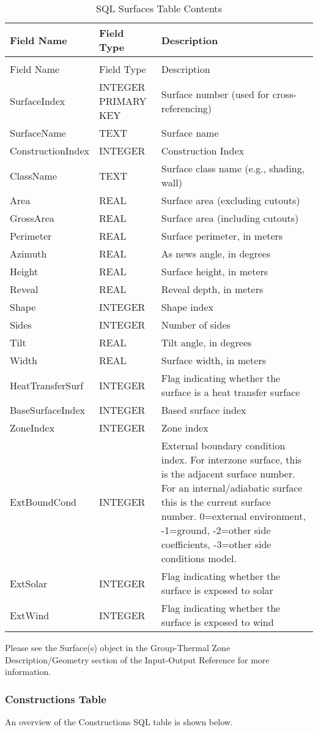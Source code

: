 \begin{longtable}[c]{p{1.5in}p{1.5in}p{3.0in}}
\caption{SQL Surfaces Table Contents \label{table:table-25.-sql-surfaces-table-contents}} \tabularnewline
\toprule 
Field Name & Field Type & Description \tabularnewline
\midrule
\endfirsthead

\caption[]{SQL Surfaces Table Contents} \tabularnewline
\toprule 
Field Name & Field Type & Description \tabularnewline
\midrule
\endhead

SurfaceIndex & INTEGER PRIMARY KEY & Surface number (used for cross-referencing) \tabularnewline
SurfaceName & TEXT & Surface name \tabularnewline
ConstructionIndex & INTEGER & Construction Index \tabularnewline
ClassName & TEXT & Surface class name (e.g., shading, wall) \tabularnewline
Area & REAL & Surface area (excluding cutouts) \tabularnewline
GrossArea & REAL & Surface area (including cutouts) \tabularnewline
Perimeter & REAL & Surface perimeter, in meters \tabularnewline
Azimuth & REAL & As news angle, in degrees \tabularnewline
Height & REAL & Surface height, in meters \tabularnewline
Reveal & REAL & Reveal depth, in meters \tabularnewline
Shape & INTEGER & Shape index \tabularnewline
Sides & INTEGER & Number of sides \tabularnewline
Tilt & REAL & Tilt angle, in degrees \tabularnewline
Width & REAL & Surface width, in meters \tabularnewline
HeatTransferSurf & INTEGER & Flag indicating whether the surface is a heat transfer surface \tabularnewline
BaseSurfaceIndex & INTEGER & Based surface index \tabularnewline
ZoneIndex & INTEGER & Zone index \tabularnewline
ExtBoundCond & INTEGER & External boundary condition index. For interzone surface, this is the adjacent surface number. For an internal/adiabatic surface this is the current surface number. 0=external environment, -1=ground, -2=other side coefficients, -3=other side conditions model. \tabularnewline
ExtSolar & INTEGER & Flag indicating whether the surface is exposed to solar \tabularnewline
ExtWind & INTEGER & Flag indicating whether the surface is exposed to wind \tabularnewline
\bottomrule
\end{longtable}

Please see the Surface(s) object in the Group-Thermal Zone Description/Geometry section of the Input-Output Reference for more information.

\subsubsection{Constructions Table}

An overview of the Constructions SQL table is shown below.

